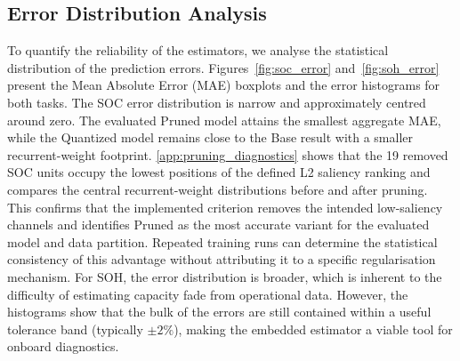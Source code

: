 \documentclass[review]{elsarticle}
\begin{document}
\subsection{Error Distribution Analysis}
To quantify the reliability of the estimators, we analyse the statistical distribution of the prediction errors. Figures~\ref{fig:soc_error} and~\ref{fig:soh_error} present the Mean Absolute Error (MAE) boxplots and the error histograms for both tasks.
The SOC error distribution is narrow and approximately centred around zero. The evaluated Pruned model attains the smallest aggregate MAE, while the Quantized model remains close to the Base result with a smaller recurrent-weight footprint. \ref{app:pruning_diagnostics} shows that the 19 removed SOC units occupy the lowest positions of the defined L2 saliency ranking and compares the central recurrent-weight distributions before and after pruning. This confirms that the implemented criterion removes the intended low-saliency channels and identifies Pruned as the most accurate variant for the evaluated model and data partition. Repeated training runs can determine the statistical consistency of this advantage without attributing it to a specific regularisation mechanism.
For SOH, the error distribution is broader, which is inherent to the difficulty of estimating capacity fade from operational data. However, the histograms show that the bulk of the errors are still contained within a useful tolerance band (typically $\pm 2\%$), making the embedded estimator a viable tool for onboard diagnostics.
\end{document}
